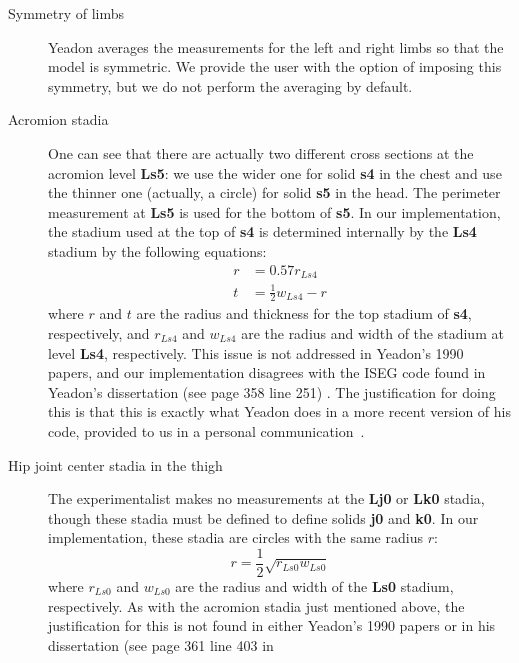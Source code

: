 \documentclass[10pt]{article}
\begin{document}
\begin{description}
    \item[Symmetry of limbs] Yeadon averages the measurements for the left and
        right limbs so that the model is symmetric. We provide the user with
        the option of imposing this symmetry, but we do not perform the
        averaging by default.
    \item[Acromion stadia] One can see that there are actually two different
        cross sections at the acromion level \textbf{Ls5}: we use the wider one
        for solid \textbf{s4} in the chest and use the thinner one (actually, a
        circle) for solid \textbf{s5} in the head. The perimeter measurement at
        \textbf{Ls5} is used for the bottom of \textbf{s5}. In our
        implementation, the stadium used at the top of \textbf{s4} is
        determined internally by the \textbf{Ls4} stadium by the following
        equations:
        \begin{align}
            r &= 0.57 r_{Ls4} \\
            t &= \frac{1}{2}w_{Ls4} - r
        \end{align}
        where $r$ and $t$ are the radius and thickness for the top stadium of
        \textbf{s4}, respectively, and $r_{Ls4}$ and $w_{Ls4}$ are the radius
        and width of the stadium at level \textbf{Ls4}, respectively.
        This issue is not addressed in Yeadon's 1990 papers, and our
        implementation disagrees with the ISEG code found in Yeadon's
        dissertation (see page 358 line 251) \cite{Yeadon1984a}. The
        justification for doing this is that this is exactly what Yeadon does
        in a more recent version of his code, provided to us in a personal
        communication~\cite{Yeadon2011}.
    \item[Hip joint center stadia in the thigh] The experimentalist makes no
        measurements at the \textbf{Lj0} or \textbf{Lk0} stadia, though these
        stadia must be defined to define solids \textbf{j0} and \textbf{k0}. In
        our implementation, these stadia are circles with the same radius $r$:
        \begin{equation}
            r = \frac{1}{2}\sqrt{r_{Ls0} w_{Ls0}}
        \end{equation}
        where $r_{Ls0}$ and $w_{Ls0}$ are the radius and width of the
        \textbf{Ls0} stadium, respectively. As with the acromion stadia just
        mentioned above, the justification for this is not found in either
        Yeadon's 1990 papers or in his dissertation (see page 361 line 403 in

\end{description}
\end{document}
